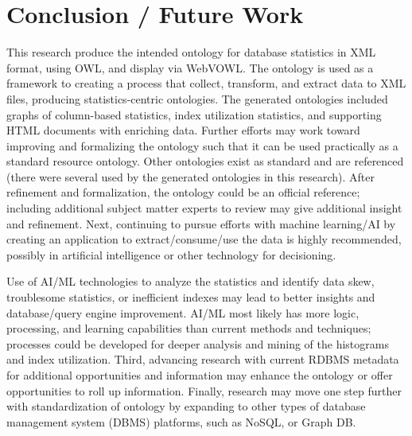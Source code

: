 \documentclass[sigconf]{acmart}
\begin{document}
\section{Conclusion / Future Work}
This research produce the intended ontology for database statistics in XML format,
using OWL, and display via WebVOWL. The ontology is used as a framework
to creating a process that collect, transform, and extract data to
XML files, producing statistics-centric ontologies. The generated ontologies included graphs of
column-based statistics, index utilization statistics, and supporting HTML documents with
enriching data. Further efforts may work toward improving and formalizing the ontology such
that it can be used practically as a standard resource ontology. Other ontologies exist as standard
and are referenced (there were several used by the generated ontologies in this research). After
refinement and formalization, the ontology could be an official reference; including additional
subject matter experts to review may give additional insight and refinement. Next, continuing to
pursue efforts with machine learning/AI by creating an application to extract/consume/use the
data is highly recommended, possibly in artificial intelligence or other technology for
decisioning. 

Use of AI/ML technologies to analyze the statistics and identify data skew,
troublesome statistics, or inefficient indexes may lead to better insights and database/query
engine improvement. AI/ML most likely has more logic, processing, and learning capabilities
than current methods and techniques; processes could be developed for deeper analysis and
mining of the histograms and index utilization. Third, advancing research with current RDBMS
metadata for additional opportunities and information may enhance the ontology or offer
opportunities to roll up information. Finally, research may move one step further with
standardization of ontology by expanding to other types of database management system (DBMS)
platforms, such as NoSQL, or Graph DB. 






\end{document}
